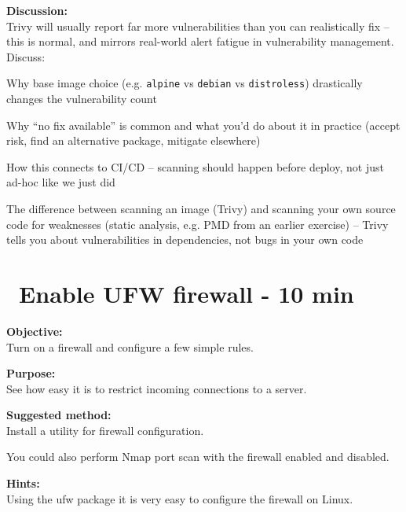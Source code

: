 \documentclass[a4paper,11pt,notitlepage]{report}
\begin{document}
{\bf Discussion:}\\
Trivy will usually report far more vulnerabilities than you can realistically fix -- this is normal, and mirrors real-world alert fatigue in vulnerability management. Discuss:
\begin{list2}
  \item Why base image choice (e.g. \verb+alpine+ vs \verb+debian+ vs \verb+distroless+) drastically changes the vulnerability count
  \item Why ``no fix available'' is common and what you'd do about it in practice (accept risk, find an alternative package, mitigate elsewhere)
  \item How this connects to CI/CD -- scanning should happen before deploy, not just ad-hoc like we just did
  \item The difference between scanning an image (Trivy) and scanning your own source code for weaknesses (static analysis, e.g. PMD from an earlier exercise) -- Trivy tells you about vulnerabilities in dependencies, not bugs in your own code
\end{list2}


\chapter{\faInfoCircle\ Enable UFW firewall - 10 min}
\label{ex:debian-firewall}

{\bf Objective:}\\
Turn on a firewall and configure a few simple rules.

{\bf Purpose:}\\
See how easy it is to restrict incoming connections to a server.


{\bf Suggested method:}\\
Install a utility for firewall configuration.

You could also perform Nmap port scan with the firewall enabled and disabled.

{\bf Hints:}\\
Using the ufw package it is very easy to configure the firewall on Linux.
\end{document}
